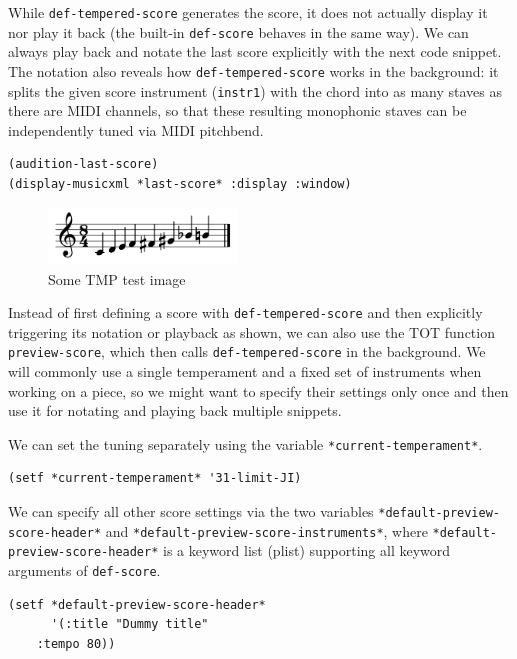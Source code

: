 \documentclass[11pt]{article}
\begin{document}
While \texttt{def-tempered-score} generates the score, it does not actually display it nor play it back
(the built-in \texttt{def-score} behaves in the same way). We can always play back and notate the last
score explicitly with the next code snippet. The notation also reveals how \texttt{def-tempered-score}
works in the background: it splits the given score instrument (\texttt{instr1}) with the chord into as
many staves as there are MIDI channels, so that these resulting monophonic staves can be
independently tuned via MIDI pitchbend.

\begin{verbatim}
(audition-last-score)
(display-musicxml *last-score* :display :window)
\end{verbatim}

\begin{figure}[htbp]
\centering
\includegraphics[angle=90,width=5cm]{./graphics/test2.png}
\caption{Some TMP test image}
\end{figure}


Instead of first defining a score with \texttt{def-tempered-score} and then explicitly triggering
its notation or playback as shown, we can also use the TOT function \texttt{preview-score}, which then calls
\texttt{def-tempered-score} in the background. We will commonly use a single temperament and a fixed set
of instruments when working on a piece, so we might want to specify their settings only once and
then use it for notating and playing back multiple snippets.

We can set the tuning separately using the variable \texttt{*current-temperament*}.

\begin{verbatim}
(setf *current-temperament* '31-limit-JI)
\end{verbatim}

We can specify all other score settings via the two variables \texttt{*default-preview-score-header*} and
\texttt{*default-preview-score-instruments*}, where \texttt{*default-preview-score-header*} is a keyword list
(plist) supporting all keyword arguments of \texttt{def-score}.

\begin{verbatim}
(setf *default-preview-score-header*
      '(:title "Dummy title"
	:tempo 80))
\end{verbatim}
\end{document}
